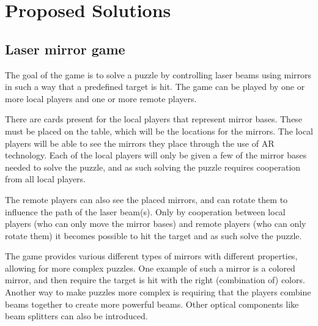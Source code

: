 \chapter{Proposed Solutions} \label{cha:solution}

\section{Laser mirror game}
	The goal of the game is to solve a puzzle by controlling laser beams 
	using mirrors in such a way that a predefined target is hit. The game 
	can be played by one or more local players and one or more remote players.
	
	There are cards present for the local players that represent mirror 
	bases. These must be placed on the table, which will be the locations 
	for the mirrors. The local players will be able to see the mirrors they 
	place through the use of AR technology. Each of the local players will 
	only be given a few of the mirror bases needed to solve the puzzle, and 
	as such solving the puzzle requires cooperation from all local players.
	
	The remote players can also see the placed mirrors, and can rotate them 
	to influence the path of the laser beam(s). Only by cooperation between 
	local players (who can only move the mirror bases) and remote players 
	(who can only rotate them) it becomes possible to hit the target and as 
	such solve the puzzle.
	
	The game provides various different types of mirrors with different 
	properties, allowing for more complex puzzles. One example of such a 
	mirror is a colored mirror, and then require the target is hit with the
	right (combination of) colors. Another way to make puzzles more complex 
	is requiring that the players combine beams together to create more 
	powerful beams. Other optical components like beam splitters can also be introduced.                                                                                                                                                                                                                                                                                                                                                                                                                                                                                                                                                                   
	
